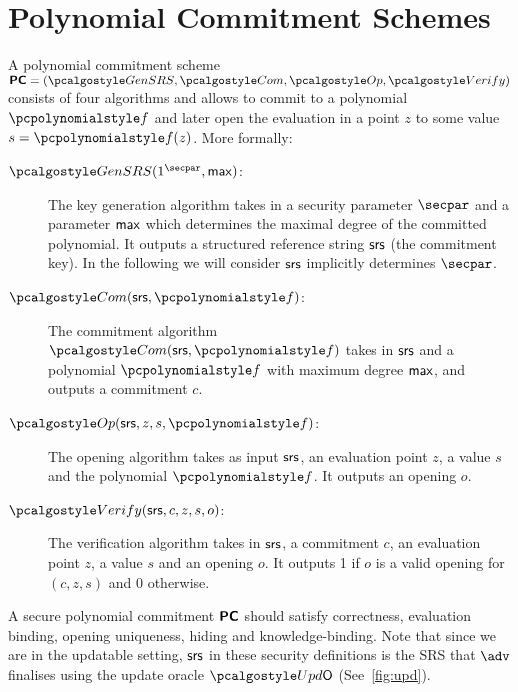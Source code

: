 


\section{Polynomial Commitment Schemes}
\label{sec:pcom}
A polynomial commitment scheme $\PCOM = (\kgen, \com, \open, \verify)$ consists of four
algorithms and allows to commit to a polynomial $\p{f}$ and later open the evaluation in a
point $z$ to some value $s=\p{f}(z)$. More formally:
\begin{description}
\item[$\kgen(1^\secpar, \maxdeg)$:] The key generation algorithm takes in a security
  parameter $\secpar$ and a parameter $\mathsf{max}$ which determines the maximal degree of the
  committed polynomial. It outputs a structured reference string $\mathsf{srs}$ (the commitment
  key). In the following we will consider $\mathsf{srs}$ implicitly determines $\secpar$.
\item[$\com(\srs, \p{f})$:] The commitment algorithm $\com(\srs, \p{f})$ takes
  in $\mathsf{srs}$ and a polynomial $\p{f}$ with maximum degree $\mathsf{max}$, and outputs
  a commitment $c$.
\item[$\open(\srs, z, s, \p{f})$:] The opening algorithm
  takes as input $\mathsf{srs}$, an evaluation point $z$, a
  value $s$ and the polynomial $\p{f}$. It outputs an opening $o$.
\item[$\verify(\srs, c, z, s, o)$:] The verification algorithm takes in $\mathsf{srs}$,
  a commitment $c$, an evaluation point $z$, a value $s$ and an opening $o$. It
  outputs 1 if $o$ is a valid opening for $(c, z, s)$ and 0 otherwise.
\end{description} 

A secure polynomial commitment $\bm{\mathsf{PC}}$ should satisfy correctness, evaluation binding,
opening uniqueness, hiding and knowledge-binding.  Note that since we are in the updatable
setting, $\mathsf{srs}$ in these security definitions is the SRS that $\advse$ finalises using the
update oracle $\initU$ (See~\cref{fig:upd}).

